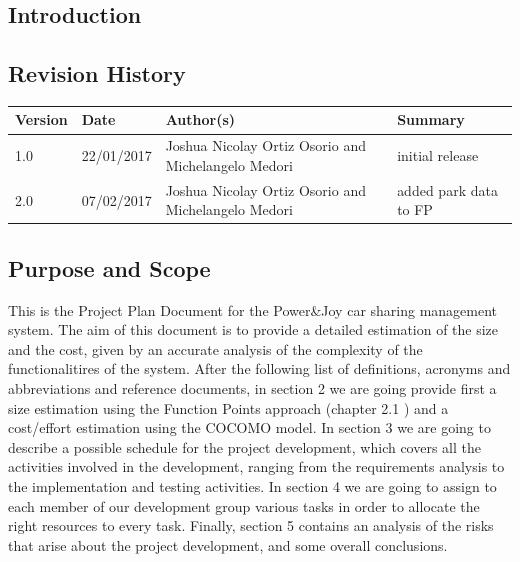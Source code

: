 \documentclass{article}
\begin{document}
\newpage   
\begin{flushleft}  

  \section{Introduction}	%
  \subsection{Revision History} 	%
  
  \begin{center}
    \begin{tabular}{ | p{2cm} | p{2cm} |  p{7 cm} | p{4cm} |}
    \hline
    \textbf{Version} &  \textbf{Date} & \textbf{Author(s)} & \textbf{Summary}  \\ 
    \hline
    
    1.0 & 22/01/2017 & Joshua Nicolay Ortiz Osorio and Michelangelo Medori & initial release
     \\ 
  \hline
  2.0 & 07/02/2017  & Joshua Nicolay Ortiz Osorio and Michelangelo Medori & added park data to FP
  \\
  \hline
  

  
    \end{tabular}
\end{center}
\vspace{1cm}
\subsection{Purpose and Scope} %
This is the Project Plan Document for the Power\&Joy car sharing management system. The aim of this document is to provide a detailed estimation of the size and the cost, given by an accurate analysis of the complexity of the functionalitires  of the system.
After the following list of definitions, acronyms and abbreviations and reference documents, in section 2 we are going provide first a size estimation using the Function Points approach (chapter 2.1 ) and a cost/effort estimation using the COCOMO model. 
In section 3 we are going to describe a possible schedule for the project development, which  covers all the activities involved in the development, ranging  from the requirements analysis to the implementation and testing activities.
In section 4 we are going to assign to each member of our development group various tasks in order to allocate the right resources to every task. 
Finally, section 5 contains an analysis of the risks that arise about the project development, and some overall conclusions.


\end{flushleft}
\end{document}
